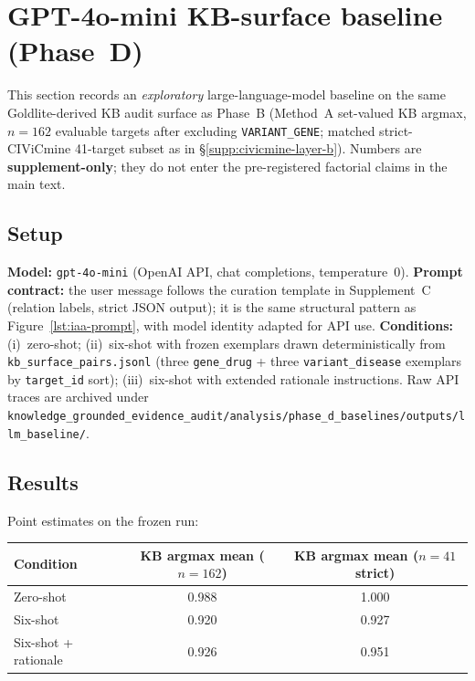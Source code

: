 \section{GPT-4o-mini KB-surface baseline (Phase~D)}
\label{supp:llm-phase-d}

This section records an \emph{exploratory} large-language-model baseline on the
same Goldlite-derived KB audit surface as Phase~B (Method~A set-valued KB argmax,
$n=162$ evaluable targets after excluding \texttt{VARIANT\_GENE}; matched
strict-CIViCmine 41-target subset as in \S\ref{supp:civicmine-layer-b}). Numbers
are \textbf{supplement-only}; they do not enter the pre-registered factorial
claims in the main text.

\subsection{Setup}
\label{supp:llm-setup}

\textbf{Model:} \texttt{gpt-4o-mini} (OpenAI API, chat completions, temperature~0).
\textbf{Prompt contract:} the user message follows the curation template in
Supplement~C (relation labels, strict JSON output); it is the same structural
pattern as Figure~\ref{lst:iaa-prompt}, with model identity adapted for
API use. \textbf{Conditions:} (i)~zero-shot; (ii)~six-shot with frozen exemplars
drawn deterministically from \texttt{kb\_surface\_pairs.jsonl} (three
\texttt{gene\_drug} + three \texttt{variant\_disease} exemplars by
\texttt{target\_id} sort); (iii)~six-shot with extended rationale instructions.
Raw API traces are archived under
\texttt{knowledge\_grounded\_evidence\_audit/analysis/phase\_d\_baselines/outputs/llm\_baseline/}.

\subsection{Results}
\label{supp:llm-results}

Point estimates on the frozen run:

\begin{center}
\begin{tabular}{lcc}
  \toprule
  Condition & KB argmax mean ($n=162$) & KB argmax mean ($n=41$ strict) \\
  \midrule
  Zero-shot & 0.988 & 1.000 \\
  Six-shot & 0.920 & 0.927 \\
  Six-shot + rationale & 0.926 & 0.951 \\
  \bottomrule
\end{tabular}
\end{center}

